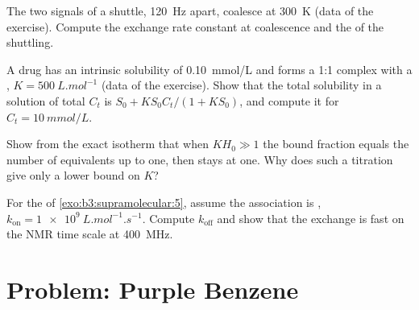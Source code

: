 \begin{exercise}[$\star\star$]\label{exo:b3:supramolecular:9}
The two signals of a  shuttle, \qty{120}{Hz} apart, coalesce at \qty{300}{K} (data of the
exercise). Compute the exchange rate constant at coalescence and the  of the shuttling.
\end{exercise}

\begin{exercise}[$\star\star\star$]\label{exo:b3:supramolecular:10}
A drug has an intrinsic solubility of \qty{0.10}{mmol/L} and forms a 1:1 complex with a
, $K = \qty{500}{L.mol^{-1}}$ (data of the exercise). Show that the total solubility in a
solution of total  $C_t$ is $S_0 + KS_0C_t/(1 + KS_0)$, and compute it for $C_t = \qty{10}{mmol/L}$.
\end{exercise}

\begin{exercise}[$\star\star\star$]\label{exo:b3:supramolecular:11}
Show from the exact isotherm that when $KH_0 \gg 1$ the bound fraction equals the
number of equivalents up to one, then stays at one. Why does such a titration
give only a lower bound on $K$?
\end{exercise}

\begin{exercise}[$\star\star\star$]\label{exo:b3:supramolecular:12}
For the  of \cref{exo:b3:supramolecular:5}, assume the association is
, $k_{\mathrm{on}} = \qty{1e9}{L.mol^{-1}.s^{-1}}$. Compute $k_{\mathrm{off}}$ and show that the exchange is fast on
the NMR time scale at \qty{400}{MHz}.
\end{exercise}

\section{Problem: Purple Benzene}

